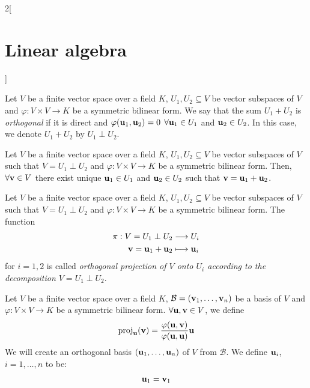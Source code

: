 \documentclass[../../../main.tex]{subfiles}
\begin{document}
\begin{multicols}{2}[\section{Linear algebra}]
\begin{definition}
    Let $V$ be a finite vector space over a field $K$, $U_1,U_2\subseteq V$ be vector subspaces of $V$ and $\varphi:V\times V\rightarrow K$ be a symmetric bilinear form. We say that the sum $U_1+U_2$ is \textit{orthogonal} if it is direct and $\varphi(\boldsymbol{\mathrm{u}}_1,\boldsymbol{\mathrm{u}}_2)=0$ $\forall \boldsymbol{\mathrm{u}}_1\in U_1$ and $\boldsymbol{\mathrm{u}}_2\in U_2$. In this case, we denote $U_1+U_2$ by $U_1\perp U_2$.
  \end{definition}
  \begin{prop}
    Let $V$ be a finite vector space over a field $K$, $U_1,U_2\subseteq V$ be vector subspaces of $V$ such that $V=U_1\perp U_2$ and $\varphi:V\times V\rightarrow K$ be a symmetric bilinear form. Then, $\forall \boldsymbol{\mathrm{v}}\in V$ there exist unique $\boldsymbol{\mathrm{u}}_1\in U_1$ and $\boldsymbol{\mathrm{u}}_2\in U_2$ such that $\boldsymbol{\mathrm{v}}=\boldsymbol{\mathrm{u}}_1+\boldsymbol{\mathrm{u}}_2$.
  \end{prop}
  \begin{definition}\label{perpendicular}
    Let $V$ be a finite vector space over a field $K$, $U_1,U_2\subseteq V$ be vector subspaces of $V$ such that $V=U_1\perp U_2$ and $\varphi:V\times V\rightarrow K$ be a symmetric bilinear form. The function
    \begin{align*}
      \pi:V=U_1\perp U_2                                           & \longrightarrow U_i              \\
      \boldsymbol{\mathrm{v}}=\boldsymbol{\mathrm{u}}_1+\boldsymbol{\mathrm{u}}_2 & \longmapsto \boldsymbol{\mathrm{u}}_i
    \end{align*}
    for $i=1,2$ is called \textit{orthogonal projection of $V$ onto $U_i$ according to the decomposition $V=U_1\perp U_2$}.
  \end{definition}
  \begin{method}
    Let $V$ be a finite vector space over a field $K$, $\mathcal{B}=(\boldsymbol{\mathrm{v}}_1,\ldots,\boldsymbol{\mathrm{v}}_n)$ be a basis of $V$ and $\varphi:V\times V\rightarrow K$ be a symmetric bilinear form. $\forall\boldsymbol{\mathrm{u}},\boldsymbol{\mathrm{v}}\in V$, we define $$\text{proj}_{\boldsymbol{\mathrm{u}}}(\boldsymbol{\mathrm{v}})=\frac{\varphi(\boldsymbol{\mathrm{u}},\boldsymbol{\mathrm{v}})}{\varphi(\boldsymbol{\mathrm{u}},\boldsymbol{\mathrm{u}})}\boldsymbol{\mathrm{u}}$$ We will create an orthogonal basis $(\boldsymbol{\mathrm{u}}_1,\ldots,\boldsymbol{\mathrm{u}}_n)$ of $V$ from $\mathcal{B}$. We define $\boldsymbol{\mathrm{u}}_i$, $i=1,\ldots,n$ to be:
    \begin{align*}
      \vectorfunction{u}_1 & =\vectorfunction{v}_1                                                                                                                   \\

\end{align*}
\end{method}
\end{multicols}
\end{document}
